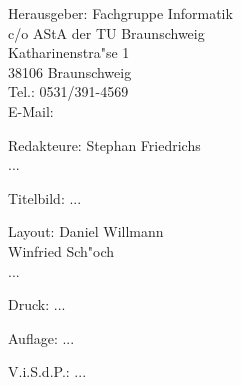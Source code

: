 \begin{nimpressum}
\item[Herausgeber:]
	Fachgruppe Informatik\\
	c/o AStA der TU Braunschweig\\
	Katharinenstra"se 1\\
	38106 Braunschweig\\
	Tel.: 0531/391-4569\\
	E-Mail: \\
\item[Redakteure:]
	Stephan Friedrichs\\
	...
\item[Titelbild:]
	...
\item[Layout:]
	Daniel Willmann\\
	Winfried Sch"och\\
	...
\item[Druck:]
	...
\item[Auflage:]
	...
\item[V.i.S.d.P.:]  %
	...
\end{nimpressum}
